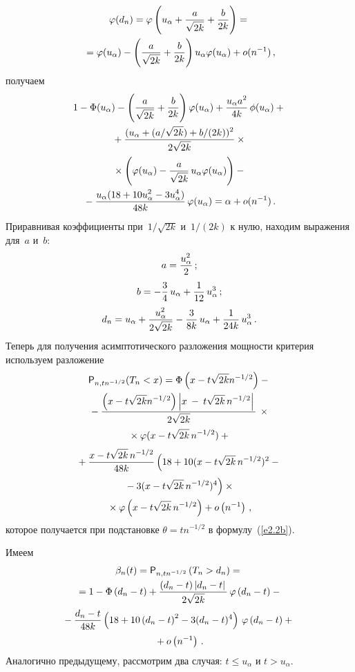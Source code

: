 \begin{multicols}{2}
\noindent
\begin{multline*}
\varphi(d_n)=\varphi\left(u_\alpha+\fr{a}{\sqrt{2k}}
+\fr{b}{2k}\right)= {}\\
{}=
\varphi(u_\alpha)-\left(\fr{a}{\sqrt{2k}}+\fr{b}{2k}\right)u_\alpha
\varphi(u_\alpha)+ o(n^{-1})\,,
\end{multline*}
получаем
\begin{multline*}
1-\Phi(u_\alpha)-\left(\fr{a}{\sqrt{2k}}+
\fr{b}{2k}\right)\varphi(u_\alpha)+\fr{u_\alpha a^2}{4k}\,\phi(u_\alpha)
+{}\\
{}+\fr{(u_\alpha+(a/\sqrt{2k})+b/(2k))^2}
{2\sqrt{2k}}\times{}\\
{}\times \left(\varphi(u_\alpha) - \fr{a}{\sqrt{2k}}\,u_\alpha
\varphi(u_\alpha)\right)-{}\\
{}-
\fr{u_\alpha(18+10u_\alpha^2-3u_\alpha^4)}{48k}\,\varphi(u_\alpha)=
\alpha + o(n^{-1})\,.
\end{multline*}
Приравнивая коэффициенты при~$1/\sqrt{2k}$ и~$1/(2k)$ к нулю,
находим выражения для~$a$ и~$b$:
\begin{gather*}
a=\fr{u_\alpha^2}{2}\,;
\\
b=-\fr{3}{4}\,u_\alpha+\fr{1}{12}\,u_\alpha^3\,;
\\
d_n = u_\alpha+\fr{u_\alpha^2}{2\sqrt{2k}}-\fr{3}{8k}\,
u_\alpha+\fr{1}{24k}\,u_\alpha^3\,.
\end{gather*}
Теперь для получения асимптотического разложения мощности критерия используем
разложение
\begin{multline*}
\p_{n,tn^{-1/2}}(T_n<x)= \Phi\left(x-t\sqrt{2k}n^{-1/2}\right) -{}\\
{}-
\fr{\left(x-t\sqrt{2k}n^{-1/2}\right)\left| x\:-\:t\sqrt{2k}\,n^{-1/2}\right|}{2\sqrt{2k}}\,
{}\times{}\\
{}\times\varphi(x-t\sqrt{2k}\,n^{-1/2})+ {}
\end{multline*}
\begin{multline*}
{}+
\fr{ x-t\sqrt{2k}\,n^{-1/2}}{48k}
\left(18+10(x-
t\sqrt{2k}\,n^{-1/2})^2-{}\right.\\
\left.{}-3(x-t\sqrt{2k}\,n^{-1/2})^4\right)\times{}
\\
{}\times\varphi\left(x-t\sqrt{2k}\,n^{-1/2}\right)+ o\left(n^{-1}\right)\,,
\end{multline*}
которое  получается при подстановке $\theta=tn^{-1/2}$ в
формулу~(\ref{e2.2b}).

Имеем
\begin{multline*}
\beta_n(t)=\p_{n,tn^{-1/2}}\left(T_n>d_n\right) ={}\\
{}=
1-\Phi\left(d_n-t\right) +
\fr{\left(d_n-t\right)\left|d_n-t\right|}{2\sqrt{2k}}\,\varphi\left(d_n-t\right)-{}
\\\!
{}-\fr{d_n-t}{48k}\left(18+10\left(d_n-t\right)^2
-3(d_n-t)^4\right)\, \varphi\left(d_n-t\right)+{}\\
{}+ o\left(n^{-1}\right)\,.
\end{multline*}
Аналогично предыдущему, рассмотрим  два случая: $t\le u_\alpha$ и
$t>u_\alpha$.


\end{multicols}
